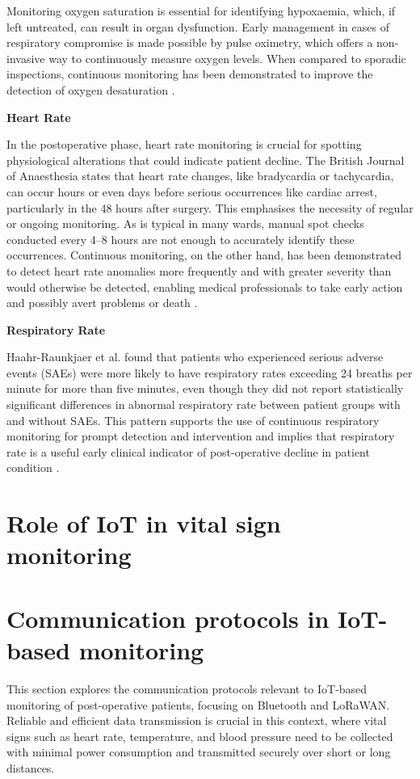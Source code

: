 Monitoring oxygen saturation is essential for identifying hypoxaemia, which, if left untreated, can result in organ dysfunction. Early management in cases of respiratory compromise is made possible by pulse oximetry, which offers a non-invasive way to continuously measure oxygen levels. When compared to sporadic inspections, continuous monitoring has been demonstrated to improve the detection of oxygen desaturation \cite{Khanna2024-fz}.

\textbf{Heart Rate}

In the postoperative phase, heart rate monitoring is crucial for spotting physiological alterations that could indicate patient decline. The British Journal of Anaesthesia states that heart rate changes, like bradycardia or tachycardia, can occur hours or even days before serious occurrences like cardiac arrest, particularly in the 48 hours after surgery. This emphasises the necessity of regular or ongoing monitoring. As is typical in many wards, manual spot checks conducted every 4–8 hours are not enough to accurately identify these occurrences. Continuous monitoring, on the other hand, has been demonstrated to detect heart rate anomalies more frequently and with greater severity than would otherwise be detected, enabling medical professionals to take early action and possibly avert problems or death \cite{Khanna2025-sg}.

\textbf{Respiratory Rate}

Haahr-Raunkjaer et al. found that patients who experienced serious adverse events (SAEs) were more likely to have respiratory rates exceeding 24 breaths per minute for more than five minutes, even though they did not report statistically significant differences in abnormal respiratory rate between patient groups with and without SAEs. This pattern supports the use of continuous respiratory monitoring for prompt detection and intervention and implies that respiratory rate is a useful early clinical indicator of post-operative decline in patient condition \cite{Haahr-Raunkjaer2022-bo}.

\section{Role of IoT in vital sign monitoring} %

\section{Communication protocols in IoT-based monitoring} %
This section explores the communication protocols relevant to IoT-based monitoring of post-operative patients, focusing on Bluetooth and LoRaWAN. Reliable and efficient data transmission is crucial in this context, where vital signs such as heart rate, temperature, and blood pressure need to be collected with minimal power consumption and transmitted securely over short or long distances.

